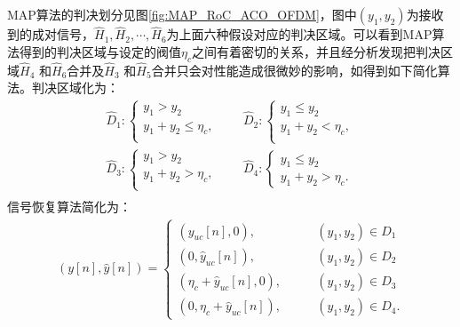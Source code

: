 MAP算法的判决划分见图\ref{fig:MAP_RoC_ACO_OFDM}，图中$(y_1,y_2)$为接收到的成对信号，$\hat{H}_1,\hat{H}_2,\cdots,\hat{H}_6$为上面六种假设对应的判决区域。可以看到MAP算法得到的判决区域与设定的阀值$\eta_c$之间有着密切的关系，并且经分析发现把判决区域$\hat{H}_4$ 和$\hat{H}_6$合并及$\hat{H}_3$ 和$\hat{H}_5$合并只会对性能造成很微妙的影响，如得到如下简化算法。判决区域化为：
\begin{equation}
\begin{aligned}
\hat{D}_1:
\begin{cases}
y_1 > y_2 \\
y_1 + y_2 \leq \eta_c,\\
\end{cases}
\qquad
\hat{D}_2:
\begin{cases}
y_1 \leq y_2 \\
y_1 + y_2 < \eta_c,\\
\end{cases}\\
\hat{D}_3:
\begin{cases}
y_1 > y_2 \\
y_1 + y_2 > \eta_c,\\
\end{cases}
\qquad
\hat{D}_4:
\begin{cases}
y_1 \leq y_2 \\
y_1 + y_2 > \eta_c.  \label{Eq_simp_decision}
\end{cases}\\
\end{aligned}
\end{equation}
信号恢复算法简化为：
\begin{equation}
\begin{split}
(y[n],\hat{y}[n])=
\begin{cases}
(y_{uc}[n],0),     & \qquad (y_1, y_2) \in \hat{D}_1  \\
(0,\hat{y}_{uc}[n]), & \qquad (y_1, y_2) \in  \hat{D}_2 \\
(\eta_c+\hat{y}_{uc}[n],0),  & \qquad (y_1, y_2) \in  \hat{D}_3   \\
(0,\eta_c+\hat{y}_{uc}[n]), & \qquad (y_1, y_2) \in  \hat{D}_4.      \label{Eq_simp_recover}
\end{cases}
\end{split}
\end{equation}

